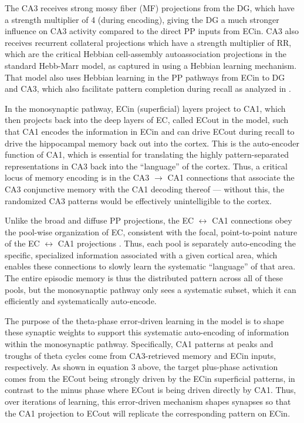 \documentclass[11pt,twoside]{article}
\newif\myifpdf
\begin{document}
The CA3 receives strong mossy fiber (MF) projections from the DG, which have a strength multiplier of 4 (during encoding), giving the DG a much stronger influence on CA3 activity compared to the direct PP inputs from ECin.  CA3 also receives recurrent collateral projections which have a strength multiplier of RR, which are the critical Hebbian cell-assembly autoassociation projections in the standard Hebb-Marr model, as captured in \cite{KetzMorkondaOReilly13} using a Hebbian learning mechanism.  That model also uses Hebbian learning in the PP pathways from ECin to DG and CA3, which also facilitate pattern completion during recall as analyzed in \citet{OReillyMcClelland94}.

In the monosynaptic pathway, ECin (superficial) layers project to CA1, which then projects back into the deep layers of EC, called ECout in the model, such that CA1 encodes the information in ECin and can drive ECout during recall to drive the hippocampal memory back out into the cortex.  This is the auto-encoder function of CA1, which is essential for translating the highly pattern-separated representations in CA3 back into the ``language'' of the cortex.  Thus, a critical locus of memory encoding is in the CA3 $\rightarrow$ CA1 connections that associate the CA3 conjunctive memory with the CA1 decoding thereof --- without this, the randomized CA3 patterns would be effectively unintelligible to the cortex.

Unlike the broad and diffuse PP projections, the EC $\leftrightarrow$ CA1 connections obey the pool-wise organization of EC, consistent with the focal, point-to-point nature of the EC $\leftrightarrow$ CA1 projections \citep{WitterDoanJacobsenEtAl17}.  Thus, each pool is separately auto-encoding the specific, specialized information associated with a given cortical area, which enables these connections to slowly learn the systematic ``language'' of that area.  The entire episodic memory is thus the distributed pattern across all of these pools, but the monosynaptic pathway only sees a systematic subset, which it can efficiently and systematically auto-encode.

The purpose of the theta-phase error-driven learning in the \citet{KetzMorkondaOReilly13} model is to shape these synaptic weights to support this systematic auto-encoding of information within the monosynaptic pathway.  Specifically, CA1 patterns at peaks and troughs of theta cycles come from CA3-retrieved memory and ECin inputs, respectively.  As shown in equation 3 above, the target plus-phase activation comes from the ECout being strongly driven by the ECin superficial patterns, in contrast to the minus phase where ECout is being driven directly by CA1.  Thus, over iterations of learning, this error-driven mechanism shapes synapses so that the CA1 projection to ECout will replicate the corresponding pattern on ECin.
\end{document}
